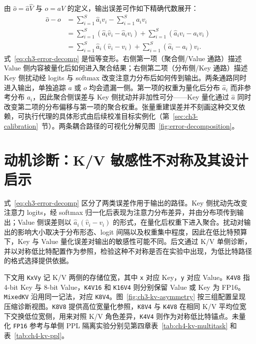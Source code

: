 由 $\hat o=\hat a\hat V$ 与 $o=aV$ 的定义，输出误差可作如下精确代数展开：
\begin{align}
\hat o-o
&=\sum_{i=1}^{S}\hat a_i\hat v_i-\sum_{i=1}^{S}a_i v_i \\
&=\sum_{i=1}^{S}(\hat a_i\hat v_i-\hat a_i v_i)+\sum_{i=1}^{S}(\hat a_i v_i-a_i v_i) \\
&=\sum_{i=1}^{S}\hat a_i(\hat v_i-v_i)+\sum_{i=1}^{S}(\hat a_i-a_i)v_i.
\label{eq:ch3-error-decomp}
\end{align}
式~\eqref{eq:ch3-error-decomp} 是恒等变形。右侧第一项（聚合侧/Value 通路）描述 Value 侧内容被量化后如何进入聚合结果；右侧第二项（分布侧/Key 通路）描述 Key 侧扰动经 logits 与 softmax 改变注意力分布后如何传到输出。两条通路同时进入输出，单独追踪 $a$ 或 $o$ 均会遗漏一侧。第一项的权重为量化后分布 $\hat a_i$ 而非参考分布 $a_i$，因此聚合侧误差与 Key 侧扰动并非加性可分——Key 量化通过 $\hat a$ 同时改变第二项的分布偏移与第一项的聚合权重。张量重建误差并不刻画这种交叉依赖，可执行代理的具体形式由后续校准目标实例化（第~\ref{sec:ch3-calibration}~节）。两条耦合路径的可视化分解见图~\ref{fig:error-decomposition}。



\section{动机诊断：K/V 敏感性不对称及其设计启示}
\label{sec:ch3-motivation-kv}

式~\eqref{eq:ch3-error-decomp} 区分了两类误差作用于输出的路径。Key 侧扰动先改变注意力 logits，经 softmax 归一化后表现为注意力分布差异，并由分布项传到输出；Value 侧误差则以 $\hat a_i(\hat v_i-v_i)$ 的形式，在量化后权重下进入聚合。扰动对输出的影响大小取决于分布形态、logit 间隔以及权重集中程度，因此在低比特预算下，Key 与 Value 量化误差对输出的敏感性可能不同。后文通过 K/V 单侧诊断，并以对称低比特配置作为参照，检验这种不对称是否在实验中出现，为低比特路径的格式选择提供依据。

下文用 \texttt{KxVy} 记 K/V 两侧的存储位宽，其中 \texttt{x} 对应 Key，\texttt{y} 对应 Value。\texttt{K4V8} 指 4-bit Key 与 8-bit Value，\texttt{K4V16} 和 \texttt{K16V4} 则分别保留 Value 或 Key 为 FP16。\texttt{MixedKV} 沿用同一记法，对应 \texttt{K8V4}。图~\ref{fig:ch3-kv-asymmetry} 按三组配置呈现压缩诊断视图。\texttt{K8V8} 提供高位宽量化参照，\texttt{K8V4} 与 \texttt{K4V8} 在相同 K/V 平均位宽下交换低位宽侧，用来对照 K/V 角色差异，\texttt{K4V4} 则作为对称低比特锚点。未量化 \texttt{FP16} 参考与单侧 PPL 隔离实验分别见第四章表~\ref{tab:ch4-kv-multitask} 和表~\ref{tab:ch4-kv-ppl}。


